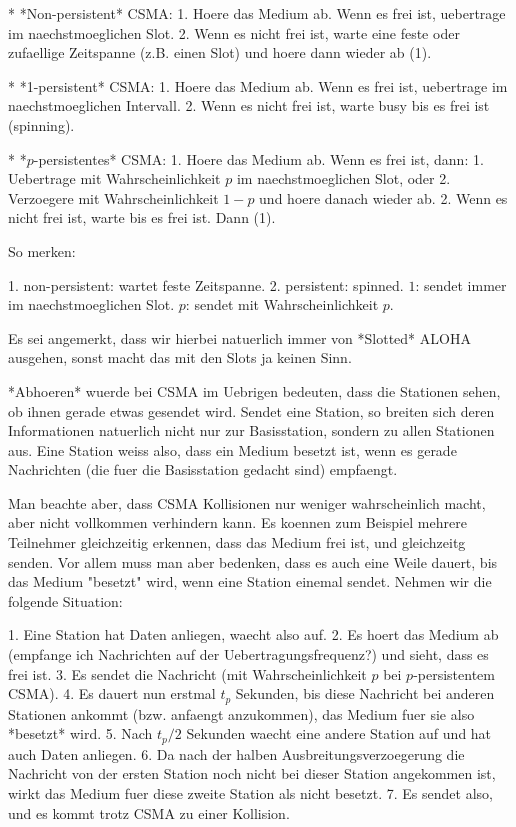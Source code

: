 * *Non-persistent* CSMA:
  1. Hoere das Medium ab. Wenn es frei ist, uebertrage im naechstmoeglichen
     Slot.
  2. Wenn es nicht frei ist, warte eine feste oder zufaellige Zeitspanne
     (z.B. einen Slot) und hoere dann wieder ab (1).

* *1-persistent* CSMA:
  1. Hoere das Medium ab. Wenn es frei ist, uebertrage im naechstmoeglichen
     Intervall.
  2. Wenn es nicht frei ist, warte busy bis es frei ist (spinning).

* *$p$-persistentes* CSMA:
  1. Hoere das Medium ab. Wenn es frei ist, dann:
	 1. Uebertrage mit Wahrscheinlichkeit $p$ im naechstmoeglichen Slot, oder
	 2. Verzoegere mit Wahrscheinlichkeit $1 - p$ und hoere danach wieder ab.
  2. Wenn es nicht frei ist, warte bis es frei ist. Dann (1).

So merken:

1. non-persistent: wartet feste Zeitspanne.
2. persistent: spinned.
   $1$: sendet immer im naechstmoeglichen Slot.
   $p$: sendet mit Wahrscheinlichkeit $p$.

Es sei angemerkt, dass wir hierbei natuerlich immer von *Slotted* ALOHA
ausgehen, sonst macht das mit den Slots ja keinen Sinn.

*Abhoeren* wuerde bei CSMA im Uebrigen bedeuten, dass die Stationen sehen, ob
ihnen gerade etwas gesendet wird. Sendet eine Station, so breiten sich deren
Informationen natuerlich nicht nur zur Basisstation, sondern zu allen Stationen
aus. Eine Station weiss also, dass ein Medium besetzt ist, wenn es gerade
Nachrichten (die fuer die Basisstation gedacht sind) empfaengt.

Man beachte aber, dass CSMA Kollisionen nur weniger wahrscheinlich macht, aber
nicht vollkommen verhindern kann. Es koennen zum Beispiel mehrere Teilnehmer
gleichzeitig erkennen, dass das Medium frei ist, und gleichzeitg senden. Vor
allem muss man aber bedenken, dass es auch eine Weile dauert, bis das Medium
"besetzt" wird, wenn eine Station einemal sendet. Nehmen wir die folgende
Situation:

1. Eine Station hat Daten anliegen, waecht also auf.
2. Es hoert das Medium ab (empfange ich Nachrichten auf der
   Uebertragungsfrequenz?) und sieht, dass es frei ist.
3. Es sendet die Nachricht (mit Wahrscheinlichkeit $p$ bei $p$-persistentem
   CSMA).
4. Es dauert nun erstmal $t_p$ Sekunden, bis diese Nachricht bei anderen
   Stationen ankommt (bzw. anfaengt anzukommen), das Medium fuer sie also
   *besetzt* wird.
5. Nach $t_p/2$ Sekunden waecht eine andere Station auf und hat auch Daten
   anliegen.
6. Da nach der halben Ausbreitungsverzoegerung die Nachricht von der ersten
   Station noch nicht bei dieser Station angekommen ist, wirkt das Medium fuer
   diese zweite Station als nicht besetzt.
7. Es sendet also, und es kommt trotz CSMA zu einer Kollision.

